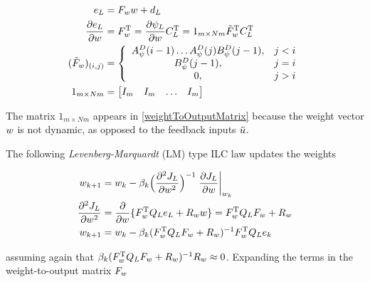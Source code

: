 \begin{equation}
\begin{aligned}
e_L &= F_{w}w + d_L \\
\frac{\partial{e_L}}{\partial{w}} &= F_{w}^{\mathrm{T}} = \frac{\partial{\psi_L}}{\partial{w}}C_L^{\mathrm{T}} = 1_{m\times Nm}\tilde{F}_{w}^{\mathrm{T}}C_L^{\mathrm{T}} \\
(\tilde{F}_{w})_{(i,j)} &= \left \{
\begin{array}{cc}
A^{D}_{\psi}(i-1)\ldots A^{D}_{\psi}(j)B^{D}_{\psi}(j-1), & j < i \\ 
B^{D}_{\psi}(j-1), & j = i \\
0, & j > i 
\end{array} \right. \\
1_{m\times Nm} &= \begin{bmatrix}
  I_{m} & I_{m} & \ldots & I_{m}
 \end{bmatrix}
\end{aligned}
\label{weightToOutputMatrix}
\end{equation}

The matrix $1_{m\times Nm}$ appears in \eqref{weightToOutputMatrix} because the weight vector $w$ is not dynamic, as opposed to the feedback inputs $\tilde{u}$.


The following \emph{Levenberg-Marquardt} (LM) type ILC law updates the weights

\begin{equation}
\begin{aligned}
w_{k+1} &= w_k - \beta_k\Big(\frac{\partial^{2}J_L}{\partial w^{2}}\Big)^{-1}\left.\frac{\partial{J_L}}{\partial{w}}\right|_{w_k} \\
\frac{\partial^{2}J_L}{\partial w^{2}} &= \frac{\partial}{\partial w}\{F_{w}^{\mathrm{T}}Q_Le_L + R_{w}w\} = F_{w}^{\mathrm{T}}Q_LF_{w} + R_{w} \\
w_{k+1} &= w_k - \beta_k(F_{w}^{\mathrm{T}}Q_LF_{w} + R_{w})^{-1}F_{w}^{\mathrm{T}}Q_Le_k
\end{aligned}
\label{ILCWeightsNewtonsMethod}
\end{equation}

assuming again that $\beta_k(F_{w}^{\mathrm{T}}Q_LF_{w} + R_{w})^{-1}R_{w} \approx 0$. Expanding the terms in the weight-to-output matrix $F_{w}$

